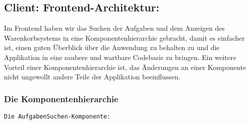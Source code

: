 \subsection{Client: Frontend-Architektur:} 

Im Frontend haben wir das Suchen der Aufgaben und dem Anzeigen des Warenkorbsystems in eine Komponentenhierarchie gebracht, damit es einfacher ist, einen guten Überblick über die Anwendung zu behalten zu und die Applikation in eine saubere und wartbare Codebasis zu bringen.
Ein weitere Vorteil einer Komponentenhierarchie ist, das Änderungen an einer Komponente nicht ungewollt andere Teile der Applikation beeinflussen.

\subsubsection{Die Komponentenhierarchie}

\texttt{Die AufgabenSuchen-Komponente:}



